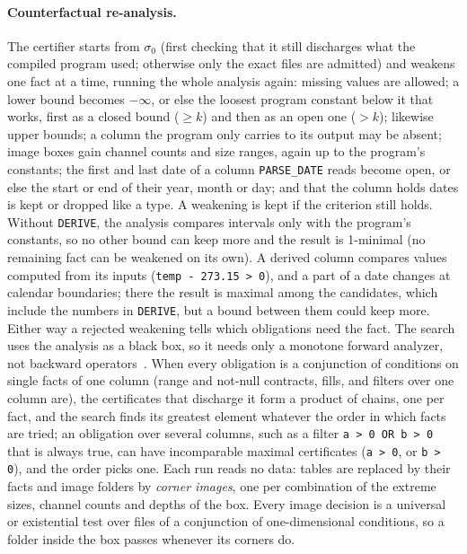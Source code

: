 \paragraph{Counterfactual re-analysis.} The certifier starts from $\sigma_0$ (first checking that it
still discharges what the compiled program used; otherwise only the exact files are admitted) and
weakens one fact at a time, running the whole analysis again: missing values are allowed; a lower
bound becomes $-\infty$, or else the loosest program constant below it that works, first as a closed
bound ($\geq k$) and then as an open one ($> k$); likewise upper bounds; a column the program only
carries to its output may be absent; image boxes gain channel counts and size ranges, again up to the
program's constants; the first and last date of a column \texttt{PARSE\_DATE} reads become open, or else
the start or end of their year, month or day; and that the column holds dates is kept or dropped like a
type. A weakening is kept if the criterion still holds. Without \texttt{DERIVE}, the analysis compares
intervals only with the program's constants, so no other bound can keep more and the result is
1-minimal (no remaining fact can be weakened on its own). A derived column compares values computed
from its inputs (\texttt{temp - 273.15 > 0}), and a part of a date changes at calendar boundaries; there
the result is maximal among the candidates, which include the numbers in \texttt{DERIVE}, but a bound
between them could keep more. Either way a rejected weakening tells which obligations need the
fact. The search uses the analysis as a black box, so it needs only a monotone forward analyzer, not
backward operators~\cite{mine2014}. When every obligation is a conjunction of conditions on single
facts of one column (range and not-null contracts, fills, and filters over one column are), the
certificates that discharge it form a product of chains, one per fact, and the search finds its
greatest element whatever the order in which facts are tried; an obligation over several columns,
such as a filter \texttt{a > 0 OR b > 0} that is always true, can have incomparable maximal
certificates (\texttt{a > 0}, or \texttt{b > 0}), and the order picks one. Each run reads no data: tables are replaced by their facts and
image folders by \emph{corner images}, one per combination of the extreme sizes, channel counts and
depths of the box. Every image decision is a universal or existential test over files of a
conjunction of one-dimensional conditions, so a folder inside the box passes whenever its corners do.


